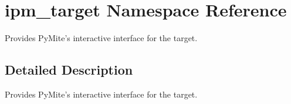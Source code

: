 \hypertarget{namespaceipm__target}{\section{ipm\-\_\-target Namespace Reference}
\label{namespaceipm__target}
}


Provides Py\-Mite's interactive interface for the target.  




\subsection{Detailed Description}
Provides Py\-Mite's interactive interface for the target. 
